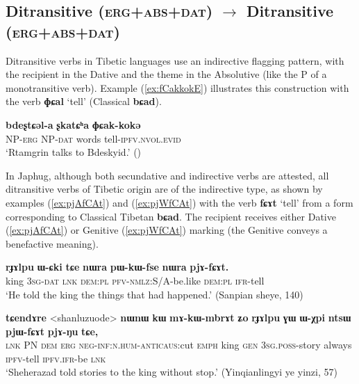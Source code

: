 \documentclass[oneside,a4paper,11pt]{article}
\newcommand{\ipa}[1]{{\phon\textbf{\mbox{#1}}}} %
\newcommand{\refb}[1]{(\ref{#1})}
\begin{document}
  \subsection{Ditransitive (\textsc{erg+abs+dat})  $\rightarrow$ Ditransitive (\textsc{erg+abs+dat})}
Ditransitive verbs in Tibetic languages use an indirective flagging pattern, with the recipient in the Dative and the theme in the Absolutive (like the P of a monotransitive verb). Example \refb{ex:fCakkokE} illustrates this construction with the verb \ipa{ɸɕal} `tell' (Classical \ipa{bɕad}).

\begin{exe}
\ex \label{ex:fCakkokE}
\gll \ipa{ʂtamɖʐən-ɣə}  \ipa{bdeʂtɕəl-a} \ipa{ʂkatɕʰa} \ipa{ɸɕak-kokə} \\
NP-\textsc{erg} NP-\textsc{dat} words tell-\textsc{ipfv.nvol.evid} \\
\glt `Rtamgrin talks to Bdeskyid.' (\citealt[87, ex. 195]{haller04themchen})
\end{exe}

In Japhug, although both secundative and indirective verbs are attested, all ditransitive verbs of Tibetic origin are of the indirective type, as shown by examples \refb{ex:pjAfCAt} and \refb{ex:pjWfCAt} with the verb \ipa{fɕɤt} `tell' from a form corresponding to Classical Tibetan \ipa{bɕad}. The recipient receives either Dative (\ref{ex:pjAfCAt}) or Genitive (\ref{ex:pjWfCAt}) marking (the Genitive conveys a benefactive meaning).

\begin{exe}
\ex \label{ex:pjAfCAt}
\gll
  \ipa{rɟɤlpu} 	\ipa{ɯ-ɕki} 	\ipa{tɕe} 	\ipa{nɯra} 	\ipa{pɯ-kɯ-fse} 	\ipa{nɯra} 	\ipa{pjɤ-fɕɤt.} \\
  king \textsc{3sg-dat} \textsc{lnk} \textsc{dem:pl} \textsc{pfv-nmlz}:S/A-be.like  \textsc{dem:pl} \textsc{ifr}-tell \\
  \glt `He told the king the things that had happened.' (Sanpian sheye, 140)
\end{exe}

\begin{exe}
\ex \label{ex:pjWfCAt}
\gll
  \ipa{tɕendɤre} 	<shanluzuode> 	\ipa{nɯnɯ} 	\ipa{kɯ} 	\ipa{mɤ-kɯ-mbrɤt} 	\ipa{ʑo} 	\ipa{rɟɤlpu} 	\ipa{ɣɯ} 	\ipa{ɯ-χpi} 	\ipa{ntsɯ} 	\ipa{pjɯ-fɕɤt} 	\ipa{pjɤ-ŋu} 	\ipa{tɕe,} \\
  \textsc{lnk} PN \textsc{dem} \textsc{erg} \textsc{neg-inf:n.hum}-\textsc{anticaus}:cut \textsc{emph} king \textsc{gen} \textsc{3sg.poss}-story always \textsc{ipfv}-tell \textsc{ipfv.ifr}-be \textsc{lnk} \\
\glt `Sheherazad told stories to the king without stop.' (Yinqianlingyi ye yinzi, 57)
\end{exe}
\end{document}
